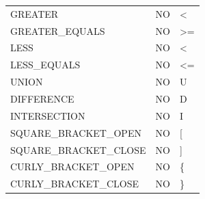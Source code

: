 \documentclass[11pt, english]{article}
\begin{document}
\begin{table}[H]
\begin{tabular}{l|l|l}
		GREATER                                                  & NO                                                                   & \textless{}                                                         \\
		GREATER\_EQUALS                                          & NO                                                                   & \textgreater{}=                                                     \\
		LESS                                                     & NO                                                                   & \textless{}                                                         \\
		LESS\_EQUALS                                             & NO                                                                   & \textless{}=                                                        \\
		UNION                                                    & NO                                                                   & U                                                                   \\
		DIFFERENCE                                               & NO                                                                   & D                                                                   \\
		INTERSECTION                                             & NO                                                                   & I                                                                   \\
		SQUARE\_BRACKET\_OPEN                                    & NO                                                                   & [                                                                  \\
		SQUARE\_BRACKET\_CLOSE                                   & NO                                                                   & ]                                                                  \\
		CURLY\_BRACKET\_OPEN                                     & NO                                                                   & \{                                                                  \\
		CURLY\_BRACKET\_CLOSE                                    & NO                                                                   & \}                                                                  \\

\end{tabular}
\end{table}
\end{document}
